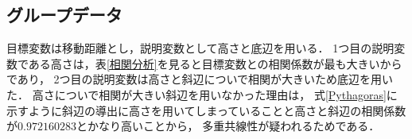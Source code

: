\documentclass[titlepage,a4paper]{jsarticle}
\begin{document}
\subsection{グループデータ}\label{グループデータ}
目標変数は移動距離とし，説明変数として高さと底辺を用いる．
1つ目の説明変数である高さは，表\ref{相関分析}を見ると目標変数との相関係数が最も大きいからであり，
2つ目の説明変数は高さと斜辺についで相関が大きいため底辺を用いた．
高さについで相関が大きい斜辺を用いなかった理由は，
式\eqref{Pythagoras}に示すように斜辺の導出に高さを用いてしまっていることと高さと斜辺の相関係数が$0.972160283$とかなり高いことから，
多重共線性が疑われるためである．
\end{document}
